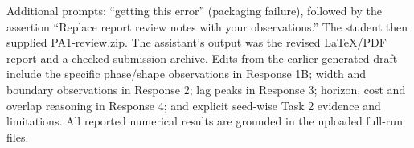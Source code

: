 Additional prompts: ``getting this error'' (packaging failure), followed by the assertion ``Replace report review notes with your observations.'' The student then supplied PA1-review.zip. The assistant's output was the revised LaTeX/PDF report and a checked submission archive. Edits from the earlier generated draft include the specific phase/shape observations in Response 1B; width and boundary observations in Response 2; lag peaks in Response 3; horizon, cost and overlap reasoning in Response 4; and explicit seed-wise Task 2 evidence and limitations. All reported numerical results are grounded in the uploaded full-run files.

